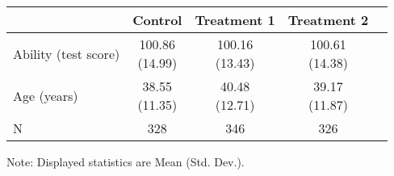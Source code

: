 \renewcommand\cellalign{t}
\begin{threeparttable}
\begin{tabular}{lcccc}
\toprule
 & Control & Treatment 1 & Treatment 2 \\
\midrule
\addlinespace
Ability (test score) & \makecell{100.86\\(14.99)} & \makecell{100.16\\(13.43)} & \makecell{100.61\\(14.38)} \\
Age (years) & \makecell{38.55\\(11.35)} & \makecell{40.48\\(12.71)} & \makecell{39.17\\(11.87)} \\
\midrule
\addlinespace
N & 328 & 346 & 326 \\
\bottomrule
\end{tabular}
\footnotesize Note: Displayed statistics are Mean (Std. Dev.).
\end{threeparttable}